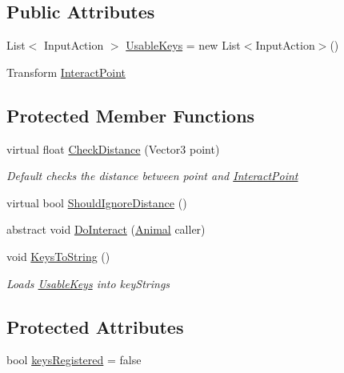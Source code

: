 \subsection*{Public Attributes}
\begin{DoxyCompactItemize}
\item 
List$<$ Input\+Action $>$ \mbox{\hyperlink{class_animal_interactor_a7de0dae23f6270d02fb18a1fcd9daeb1}{Usable\+Keys}} = new List$<$Input\+Action$>$()
\item 
Transform \mbox{\hyperlink{class_animal_interactor_abad93e377f12a32e8b96e0285c7fc1b2}{Interact\+Point}}
\end{DoxyCompactItemize}
\subsection*{Protected Member Functions}
\begin{DoxyCompactItemize}
\item 
virtual float \mbox{\hyperlink{class_animal_interactor_a2ad1cb30f205eb70a693ab12f7c635af}{Check\+Distance}} (Vector3 point)
\begin{DoxyCompactList}\small\item\em Default checks the distance between {\itshape point}  and \mbox{\hyperlink{class_animal_interactor_abad93e377f12a32e8b96e0285c7fc1b2}{Interact\+Point}} \end{DoxyCompactList}\item 
virtual bool \mbox{\hyperlink{class_animal_interactor_aa69a72f1594b510e34f70b55d6d72564}{Should\+Ignore\+Distance}} ()
\item 
abstract void \mbox{\hyperlink{class_animal_interactor_a522811ab410a5acbc12362e29263c5a8}{Do\+Interact}} (\mbox{\hyperlink{class_animal}{Animal}} caller)
\item 
void \mbox{\hyperlink{class_animal_interactor_ab391bd0cc25697723efb18162d4cfbcc}{Keys\+To\+String}} ()
\begin{DoxyCompactList}\small\item\em Loads \mbox{\hyperlink{class_animal_interactor_a7de0dae23f6270d02fb18a1fcd9daeb1}{Usable\+Keys}} into key\+Strings \end{DoxyCompactList}\end{DoxyCompactItemize}
\subsection*{Protected Attributes}
\begin{DoxyCompactItemize}
\item 
bool \mbox{\hyperlink{class_animal_interactor_a25c06ce53b655dc41349cbe0df85ce3f}{keys\+Registered}} = false
\end{DoxyCompactItemize}

